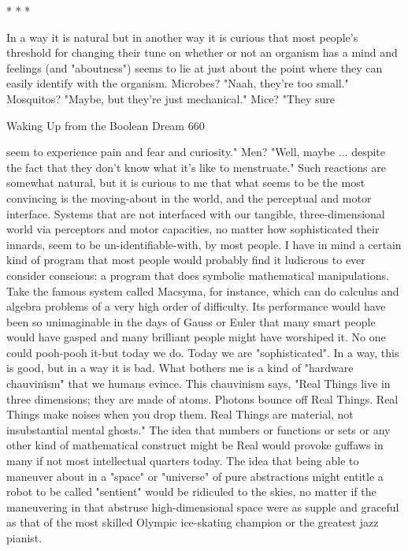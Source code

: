                                         *   *   *

        In a way it is natural but in another way it is curious that most people's
threshold for changing their tune on whether or not an organism has a mind and
feelings (and "aboutness") seems to lie at just about the point where they can easily
identify with the organism. Microbes? "Naah, they're too small." Mosquitos? "Maybe,
but they're just mechanical." Mice? "They sure




Waking Up from the Boolean Dream                                                      660

seem to experience pain and fear and curiosity." Men? "Well, maybe ... despite the
fact that they don't know what it's like to menstruate."
        Such reactions are somewhat natural, but it is curious to me that what seems to
be the most convincing is the moving-about in the world, and the perceptual and
motor interface. Systems that are not interfaced with our tangible, three-dimensional
world via perceptors and motor capacities, no matter how sophisticated their innards,
seem to be un-identifiable-with, by most people. I have in mind a certain kind of
program that most people would probably find it ludicrous to ever consider conscious:
a program that does symbolic mathematical manipulations. Take the famous system
called Macsyma, for instance, which can do calculus and algebra problems of a very
high order of difficulty. Its performance would have been so unimaginable in the days
of Gauss or Euler that many smart people would have gasped and many brilliant
people might have worshiped it. No one could pooh-pooh it-but today we do. Today
we are "sophisticated". In a way, this is good, but in a way it is bad.
        What bothers me is a kind of "hardware chauvinism" that we humans evince.
This chauvinism says, "Real Things live in three dimensions; they are made of atoms.
Photons bounce off Real Things. Real Things make noises when you drop them. Real
Things are material, not insubstantial mental ghosts." The idea that numbers or
functions or sets or any other kind of mathematical construct might be Real would
provoke guffaws in many if not most intellectual quarters today. The idea that being
able to maneuver about in a "space" or "universe" of pure abstractions might entitle a
robot to be called "sentient" would be ridiculed to the skies, no matter if the
maneuvering in that abstruse high-dimensional space were as supple and graceful as
that of the most skilled Olympic ice-skating champion or the greatest jazz pianist.
